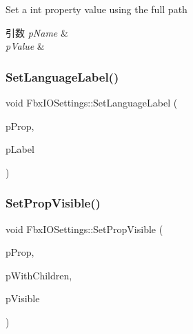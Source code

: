 Set a int property value using the full path 
\begin{DoxyParams}{引数}
{\em p\+Name} & \\
\hline
{\em p\+Value} & \\
\hline
\end{DoxyParams}
\mbox{\label{class_fbx_i_o_settings_ac2fc08a0a553a6fc6c4e5e9891b6ad38}} 
\subsubsection{\texorpdfstring{Set\+Language\+Label()}{SetLanguageLabel()}}
{\footnotesize\ttfamily void Fbx\+I\+O\+Settings\+::\+Set\+Language\+Label (\begin{DoxyParamCaption}\item[{\hyperlink{class_fbx_property}{Fbx\+Property} \&}]{p\+Prop,  }\item[{\hyperlink{class_fbx_string}{Fbx\+String} \&}]{p\+Label }\end{DoxyParamCaption})}

\mbox{\label{class_fbx_i_o_settings_a23c19390ac805e94866ae738953bb479}} 
\subsubsection{\texorpdfstring{Set\+Prop\+Visible()}{SetPropVisible()}}
{\footnotesize\ttfamily void Fbx\+I\+O\+Settings\+::\+Set\+Prop\+Visible (\begin{DoxyParamCaption}\item[{\hyperlink{class_fbx_property}{Fbx\+Property} \&}]{p\+Prop,  }\item[{bool}]{p\+With\+Children,  }\item[{bool}]{p\+Visible }\end{DoxyParamCaption})}

\mbox{\label{class_fbx_i_o_settings_aadffc404d2cfc79ee842265c46abbc12}} 
